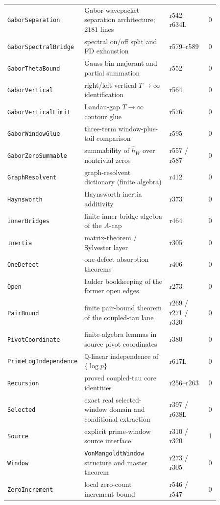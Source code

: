 \documentclass[11pt]{article}
\theoremstyle{definition}
\theoremstyle{remark}
\begin{document}
\begin{longtable}{@{}
  >{\raggedright\arraybackslash}p{0.28\linewidth}
  >{\raggedright\arraybackslash}p{0.40\linewidth}
  >{\raggedright\arraybackslash}p{0.18\linewidth}
  c@{}}
\texttt{GaborSeparation} & Gabor-wavepacket separation architecture; $2181$ lines & r542--r634L & 0\\
\texttt{GaborSpectralBridge} & spectral on/off split and FD exhaustion & r579--r589 & 0\\
\texttt{GaborThetaBound} & Gauss-bin majorant and partial summation & r552 & 0\\
\texttt{GaborVertical} & right/left vertical $T\to\infty$ identification & r564 & 0\\
\texttt{GaborVerticalLimit} & Landau-gap $T\to\infty$ contour glue & r576 & 0\\
\texttt{GaborWindowGlue} & three-term window-plus-tail comparison & r595 & 0\\
\texttt{GaborZeroSummable} & summability of $\hat h_W$ over nontrivial zeros & r557 / r587 & 0\\
\texttt{GraphResolvent} & graph-resolvent dictionary (finite algebra) & r412 & 0\\
\texttt{Haynsworth} & Haynsworth inertia additivity & r373 & 0\\
\texttt{InnerBridges} & finite inner-bridge algebra of the $A$-cap & r464 & 0\\
\texttt{Inertia} & matrix-theorem / Sylvester layer & r305 & 0\\
\texttt{OneDefect} & one-defect absorption theorems & r406 & 0\\
\texttt{Open} & ladder bookkeeping of the former open edges & r273 & 0\\
\texttt{PairBound} & finite pair-bound theorem of the coupled-tau lane & r269 / r271 / r320 & 0\\
\texttt{PivotCoordinate} & finite-algebra lemmas in source pivot coordinates & r380 & 0\\
\texttt{PrimeLogIndependence} & $\mathbb Q$-linear independence of $\{\log p\}$ & r617L & 0\\
\texttt{Recursion} & proved coupled-tau core identities & r256--r263 & 0\\
\texttt{Selected} & exact real selected-window domain and conditional extraction & r397 / r638L & 0\\
\texttt{Source} & explicit prime-window source interface & r310 / r320 & 1\\
\texttt{Window} & \texttt{VonMangoldtWindow} structure and master theorem & r273 / r305 & 0\\
\texttt{ZeroIncrement} & local zero-count increment bound & r546 / r547 & 0\\
\bottomrule
\end{longtable}
\endgroup
\end{document}
